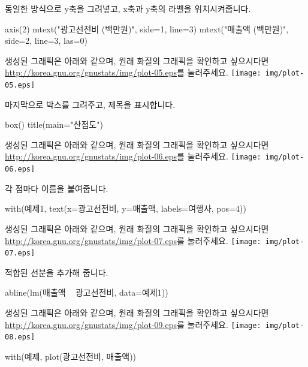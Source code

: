 동일한 방식으로 y축을 그려넣고, x축과 y축의 라벨을 위치시켜줍니다. 
\begin{Schunk}
\begin{Soutput}	
axis(2)
mtext("광고선전비 (백만원)", side=1, line=3)
mtext("매출액 (백만원)", side=2, line=3, las=0)
\end{Soutput}
\end{Schunk}
생성된 그래픽은 아래와 같으며, 원래 화질의 그래픽을 확인하고 싶으시다면 \href{http://korea.gnu.org/gnustats/img/plot-05.eps}{http://korea.gnu.org/gnustats/img/plot-05.eps}를 눌러주세요. 
\texttt{[image: img/plot-05.eps]}


마지막으로 박스를 그려주고, 제목을 표시합니다. 
\begin{Schunk}
\begin{Soutput}	
box()
title(main="산점도")
\end{Soutput}
\end{Schunk}
생성된 그래픽은 아래와 같으며, 원래 화질의 그래픽을 확인하고 싶으시다면 \href{http://korea.gnu.org/gnustats/img/plot-06.eps}{http://korea.gnu.org/gnustats/img/plot-06.eps}를 눌러주세요. 
\texttt{[image: img/plot-06.eps]}

각 점마다 이름을 붙여줍니다.
\begin{Schunk}
\begin{Soutput}	
with(예제1, text(x=광고선전비, y=매출액, labels=여행사, pos=4))
\end{Soutput}
\end{Schunk}
생성된 그래픽은 아래와 같으며, 원래 화질의 그래픽을 확인하고 싶으시다면 \href{http://korea.gnu.org/gnustats/img/plot-07.eps}{http://korea.gnu.org/gnustats/img/plot-07.eps}를 눌러주세요. 
\texttt{[image: img/plot-07.eps]}

적합된 선분을 추가해 줍니다. 
\begin{Schunk}
\begin{Soutput}	
abline(lm(매출액 ~ 광고선전비, data=예제1))
\end{Soutput}
\end{Schunk}
생성된 그래픽은 아래와 같으며, 원래 화질의 그래픽을 확인하고 싶으시다면 \href{http://korea.gnu.org/gnustats/img/plot-08.eps}{http://korea.gnu.org/gnustats/img/plot-09.eps}를 눌러주세요. 
\texttt{[image: img/plot-08.eps]}


\begin{Schunk}
\begin{Soutput}
with(예제, plot(광고선전비, 매출액))
\end{Soutput}
\end{Schunk}


